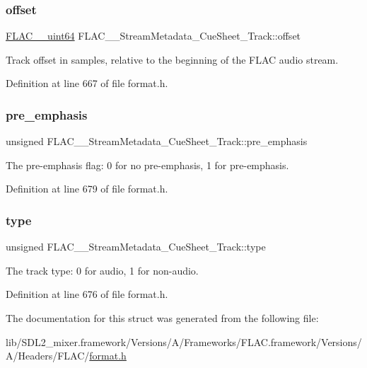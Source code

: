 \subsubsection{\texorpdfstring{offset}{offset}}
{\footnotesize\ttfamily \mbox{\hyperlink{ordinals_8h_aa78c8c70a3eb8a58af7436f278acde8e}{F\+L\+A\+C\+\_\+\+\_\+uint64}} F\+L\+A\+C\+\_\+\+\_\+\+Stream\+Metadata\+\_\+\+Cue\+Sheet\+\_\+\+Track\+::offset}

Track offset in samples, relative to the beginning of the F\+L\+AC audio stream. 

Definition at line 667 of file format.\+h.

\mbox{\label{struct_f_l_a_c_____stream_metadata___cue_sheet___track_ab4a97e43166ee16d1d16cccd901ddc3a}} 
\subsubsection{\texorpdfstring{pre\_emphasis}{pre\_emphasis}}
{\footnotesize\ttfamily unsigned F\+L\+A\+C\+\_\+\+\_\+\+Stream\+Metadata\+\_\+\+Cue\+Sheet\+\_\+\+Track\+::pre\+\_\+emphasis}

The pre-\/emphasis flag\+: 0 for no pre-\/emphasis, 1 for pre-\/emphasis. 

Definition at line 679 of file format.\+h.

\mbox{\label{struct_f_l_a_c_____stream_metadata___cue_sheet___track_a848575fc7a7292867ce76a9b3705f6e7}} 
\subsubsection{\texorpdfstring{type}{type}}
{\footnotesize\ttfamily unsigned F\+L\+A\+C\+\_\+\+\_\+\+Stream\+Metadata\+\_\+\+Cue\+Sheet\+\_\+\+Track\+::type}

The track type\+: 0 for audio, 1 for non-\/audio. 

Definition at line 676 of file format.\+h.



The documentation for this struct was generated from the following file\+:\begin{DoxyCompactItemize}
\item 
lib/\+S\+D\+L2\+\_\+mixer.\+framework/\+Versions/\+A/\+Frameworks/\+F\+L\+A\+C.\+framework/\+Versions/\+A/\+Headers/\+F\+L\+A\+C/\mbox{\hyperlink{format_8h}{format.\+h}}\end{DoxyCompactItemize}

